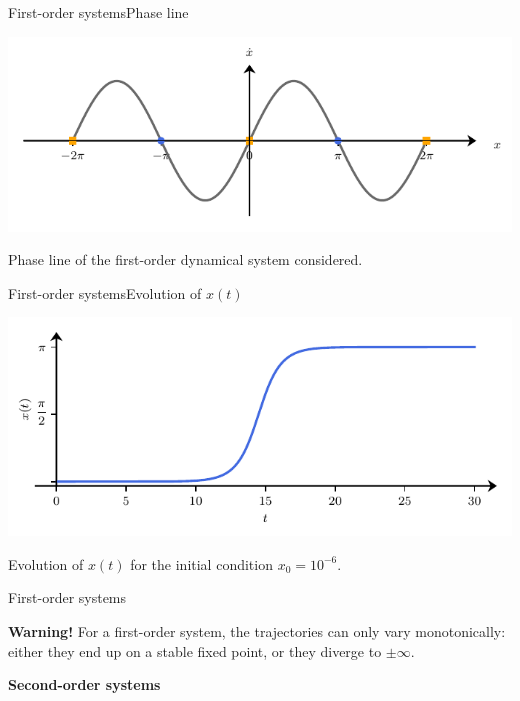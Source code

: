 \documentclass[usenames,dvipsnames,svgnames,10pt,aspectratio=169]{beamer}
\begin{document}
\begin{frame}[t, c]{First-order systems}{Phase line}
	\centering

	\includegraphics[width=.75\textwidth]{flow_on_the_line}

		\bigskip

		Phase line of the first-order dynamical system considered.
	\vspace{1cm}
\end{frame}

\begin{frame}[t, c]{First-order systems}{Evolution of $x(t)$}
	\centering

		\includegraphics[width=.75\textwidth]{flow_on_the_line_bis}

		\bigskip

		Evolution of $x(t)$ for the initial condition $x_0 = 10^{-6}$.

	\vspace{1cm}
\end{frame}

\begin{frame}[t, c]{First-order systems}{}

	\centering
	\begin{block}{\centering \textbf{Warning!}}
		For a first-order system, the trajectories can only vary monotonically: either they end up on a stable fixed point, or they diverge to $\pm \infty$.
	\end{block}

	\vspace{1cm}
\end{frame}


\begin{frame}[t, c]{}
	\centering
	\vspace{1cm}

	{\Large \textbf{Second-order systems}}

	\bigskip

	{}

\end{frame}
\end{document}

